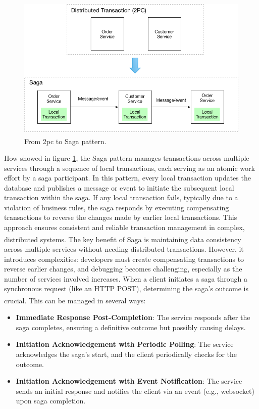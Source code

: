 \begin{figure}
    \centering
    \includegraphics[scale=0.5]{Pictures/3_saga.png}
    \caption{From 2pc to Saga pattern\textsuperscript{\cite{io_sagas}}.}
    \label{fig:3_saga}
\end{figure}

How showed in figure \ref{fig:3_saga}, the Saga pattern manages transactions across multiple
services through a sequence of local transactions, each serving as an atomic work effort by a saga
participant. In this pattern, every local transaction updates the database and publishes a message
or event to initiate the subsequent local transaction within the saga. If any local transaction
fails, typically due to a violation of business rules, the saga responds by executing compensating
transactions to reverse the changes made by earlier local transactions. This approach ensures
consistent and reliable transaction management in complex, distributed
systems\textsuperscript{\cite{ms_sagas}}\textsuperscript{\cite{io_sagas}}.
\newline\newline
The key benefit of Saga is maintaining data consistency across multiple services without needing
distributed transactions. However, it introduces complexities: developers must create compensating
transactions to reverse earlier changes, and debugging becomes challenging, especially as the number
of services involved increases.
When a client initiates a saga through a synchronous request (like an HTTP POST), determining the
saga's outcome is crucial. This can be managed in several ways\textsuperscript{\cite{io_sagas}}:

\begin{itemize}
    \item \textbf{Immediate Response Post-Completion}: The service responds after the saga
          completes, ensuring a definitive outcome but possibly causing delays.
    \item \textbf{Initiation Acknowledgement with Periodic Polling}: The service acknowledges the
          saga's start, and the client periodically checks for the outcome.
    \item \textbf{Initiation Acknowledgement with Event Notification}: The service sends an initial
          response and notifies the client via an event (e.g., websocket) upon saga completion.
\end{itemize}

